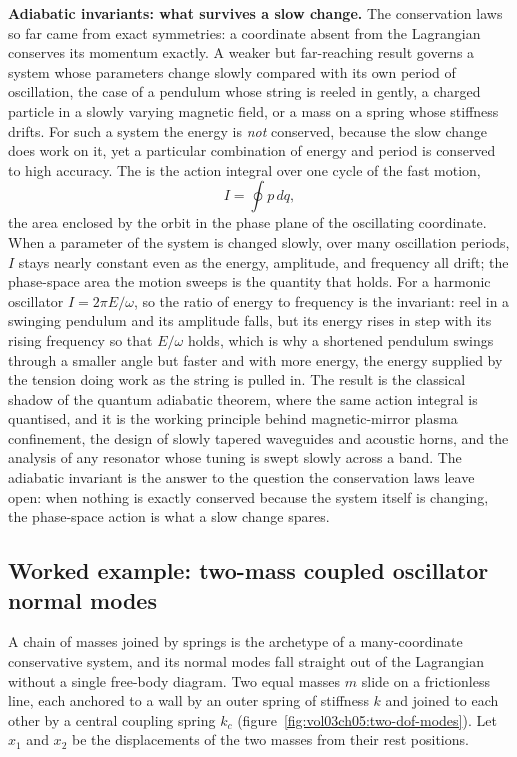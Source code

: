 \begin{mastery}
\textbf{Adiabatic invariants: what survives a slow change.} The conservation
laws so far came from exact symmetries: a coordinate absent from the
Lagrangian conserves its momentum exactly. A weaker but far-reaching result
governs a system whose parameters change slowly compared with its own period
of oscillation, the case of a pendulum whose string is reeled in gently, a
charged particle in a slowly varying magnetic field, or a mass on a spring
whose stiffness drifts. For such a system the energy is \emph{not} conserved,
because the slow change does work on it, yet a particular combination of
energy and period is conserved to high accuracy. The  is the action integral over one cycle of the fast motion,
\[
I = \oint p\,dq,
\]
the area enclosed by the orbit in the phase plane of the oscillating
coordinate. When a parameter of the system is changed slowly, over many
oscillation periods, $I$ stays nearly constant even as the energy, amplitude,
and frequency all drift; the phase-space area the motion sweeps is the
quantity that holds. For a harmonic oscillator $I = 2\pi E/\omega$, so the ratio of
energy to frequency is the invariant: reel in a swinging pendulum and its
amplitude falls, but its energy rises in step with its rising frequency so
that $E/\omega$ holds, which is why a shortened pendulum swings through a
smaller angle but faster and with more energy, the energy supplied by the
tension doing work as the string is pulled in. The result is the classical
shadow of the quantum adiabatic theorem, where the same action integral is
quantised, and it is the working principle behind magnetic-mirror plasma
confinement, the design of slowly tapered waveguides and acoustic horns, and
the analysis of any resonator whose tuning is swept slowly across a band. The
adiabatic invariant is the answer to the question the conservation laws leave
open: when nothing is exactly conserved because the system itself is
changing, the phase-space action is what a slow change spares.
\end{mastery}

\subsection{Worked example: two-mass coupled oscillator normal modes}

A chain of masses joined by springs is the archetype of a many-coordinate
conservative system, and its normal modes fall straight out of the Lagrangian
without a single free-body diagram. Two equal masses $m$ slide on a frictionless
line, each anchored to a wall by an outer spring of stiffness $k$ and joined to
each other by a central coupling spring $k_c$
(figure~\ref{fig:vol03ch05:two-dof-modes}). Let $x_1$ and $x_2$ be the
displacements of the two masses from their rest positions.

